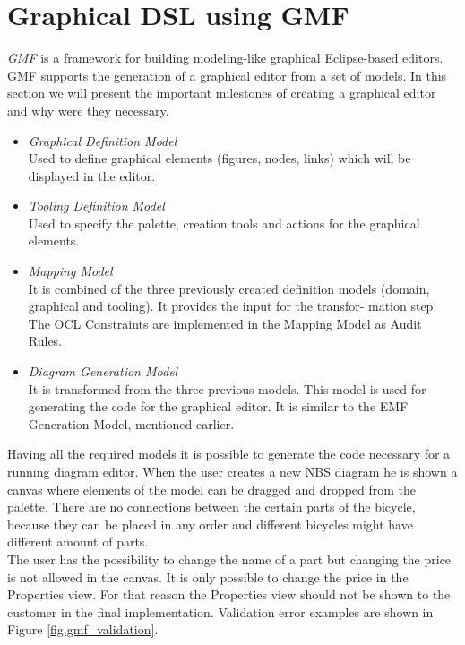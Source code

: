 \section{Graphical DSL using GMF}
\label{sec.gmf}

\noindent \emph{GMF} is a framework for
building modeling-like graphical Eclipse-based editors.
\cite{Article_Introducing_GMF} GMF supports the generation of a graphical editor
from a set of models. In this section we will present the important
milestones of creating a graphical editor and why were they necessary. 

\begin{itemize}
  \item \emph{Graphical Definition Model}\\
  \noindent Used to define graphical elements (figures, nodes, links) which will
  be displayed in the editor.
  \item \emph{Tooling Definition Model}\\
  \noindent Used to specify the palette, creation tools and actions for the
  graphical elements.
  \item \emph{Mapping Model}\\
  \noindent It is combined of the three previously
created definition models (domain, graphical and tooling). It provides the input
for the transfor- mation step. The OCL Constraints are implemented in the Mapping Model as Audit Rules.
  \item \emph{Diagram Generation Model}\\
  \noindent It is transformed from the three previous models. This model
is used for generating the code for the graphical editor. It is similar to the EMF Generation
Model, mentioned earlier. \cite{GMF_Tutorial}  
\end{itemize}

\noindent Having all the required models it is possible to generate the code
necessary for a running diagram editor. When the user creates a new NBS diagram he is
shown a canvas where elements of the model can be dragged and dropped from the
palette. There are no connections between the certain parts
of the bicycle, because they can be placed in any order and different bicycles
might have different amount of parts. \\

\noindent The user has the possibility to change the name of a part but changing
the price is not allowed in the canvas. It is only possible to change the
price in the Properties view. For that reason the Properties view should not be
shown to the customer in the final implementation.  
Validation error examples are shown in Figure \ref{fig.gmf_validation}.\\

